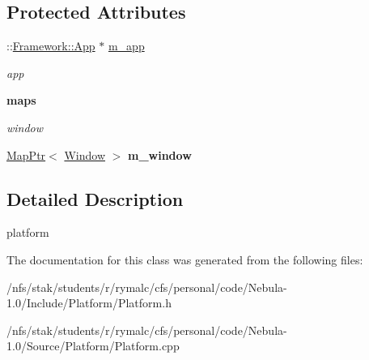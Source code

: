 \subsection*{Protected Attributes}
\begin{DoxyCompactItemize}
\item 
\hypertarget{classPlatform_1_1Platform_ad007576e8f1ae40faf49515615c333c0}{
::\hyperlink{classFramework_1_1App}{Framework::App} $\ast$ \hyperlink{classPlatform_1_1Platform_ad007576e8f1ae40faf49515615c333c0}{m\_\-app}}
\label{classPlatform_1_1Platform_ad007576e8f1ae40faf49515615c333c0}

\begin{DoxyCompactList}\small\item\em app \item\end{DoxyCompactList}\end{DoxyCompactItemize}
\begin{Indent}{\bf maps}\par
{\em \label{_amgrp7e94476d62556cc8501e3df5b8d6470d}
 window }\begin{DoxyCompactItemize}
\item 
\hypertarget{classPlatform_1_1Platform_ac62e132ffa9de1ae5f6bf4d0e355e3f0}{
\hyperlink{classMapPtr}{MapPtr}$<$ \hyperlink{classPlatform_1_1Window}{Window} $>$ {\bfseries m\_\-window}}
\label{classPlatform_1_1Platform_ac62e132ffa9de1ae5f6bf4d0e355e3f0}

\end{DoxyCompactItemize}
\end{Indent}


\subsection{Detailed Description}
platform 

The documentation for this class was generated from the following files:\begin{DoxyCompactItemize}
\item 
/nfs/stak/students/r/rymalc/cfs/personal/code/Nebula-\/1.0/Include/Platform/Platform.h\item 
/nfs/stak/students/r/rymalc/cfs/personal/code/Nebula-\/1.0/Source/Platform/Platform.cpp\end{DoxyCompactItemize}
